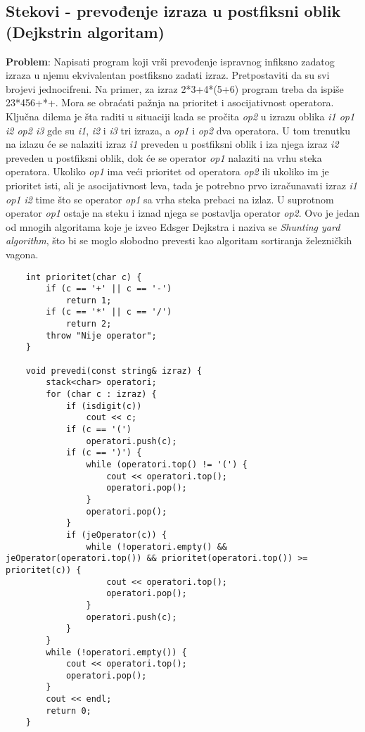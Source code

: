 \documentclass{article}
\begin{document}
\subsection{Stekovi - prevođenje izraza u postfiksni oblik (Dejkstrin algoritam)}
\textbf{Problem}: Napisati program koji vrši prevođenje ispravnog infiksno zadatog izraza u njemu ekvivalentan postfiksno zadati izraz. Pretpostaviti da su svi brojevi jednocifreni. Na primer, za izraz 2*3+4*(5+6) program treba da ispiše 23*456+*+.
\newline Mora se obraćati pažnja na prioritet i asocijativnost operatora. Ključna dilema je
šta raditi u situaciji kada se pročita \textit{op2} u izrazu oblika \textit{i1 op1 i2 op2 i3} gde
su \textit{i1}, \textit{i2} i \textit{i3} tri izraza, a \textit{op1} i \textit{op2} dva
operatora. U tom trenutku na izlazu će se nalaziti izraz \textit{i1} preveden u postfiksni
oblik i iza njega izraz \textit{i2} preveden u postfiksni oblik, dok će se operator \textit{op1}
nalaziti na vrhu steka operatora. Ukoliko \textit{op1} ima veći prioritet od operatora
\textit{op2} ili ukoliko im je prioritet isti, ali je asocijativnost leva, tada je potrebno prvo
izračunavati izraz \textit{i1 op1 i2} time što se operator \textit{op1} sa vrha steka prebaci
na izlaz. U suprotnom operator \textit{op1} ostaje na steku i iznad njega se postavlja operator \textit{op2}.
\newline Ovo je jedan od mnogih algoritama koje je izveo Edsger Dejkstra i naziva se \textit{Shunting yard algorithm}, što bi se moglo slobodno prevesti kao algoritam sortiranja železničkih vagona.
\begin{lstlisting}
    int prioritet(char c) {
        if (c == '+' || c == '-')
            return 1;
        if (c == '*' || c == '/')
            return 2;
        throw "Nije operator";
    }
    
    void prevedi(const string& izraz) {
        stack<char> operatori;
        for (char c : izraz) {
            if (isdigit(c))
                cout << c;
            if (c == '(')
                operatori.push(c);
            if (c == ')') {
                while (operatori.top() != '(') {
                    cout << operatori.top();
                    operatori.pop();
                }
                operatori.pop();
            }
            if (jeOperator(c)) {
                while (!operatori.empty() && jeOperator(operatori.top()) && prioritet(operatori.top()) >= prioritet(c)) {
                    cout << operatori.top();
                    operatori.pop();
                }
                operatori.push(c);
            }
        }
        while (!operatori.empty()) {
            cout << operatori.top();
            operatori.pop();
        }
        cout << endl;
        return 0;
    }
\end{lstlisting}
\end{document}

